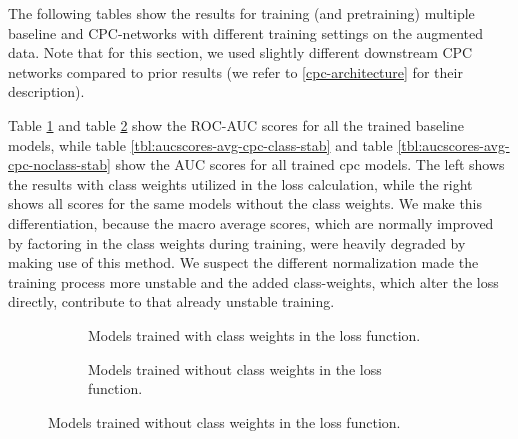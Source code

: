 The following tables show the results for training (and pretraining) multiple baseline and CPC-networks with different training settings on the augmented data. Note that for this section, we used slightly different downstream CPC networks compared to prior results (we refer to \autoref{cpc-architecture} for their description).

Table \ref{tbl:aucscores-avg-bl-class-stab} and table \ref{tbl:aucscores-avg-bl-noclass-stab} show the ROC-AUC scores for all the trained baseline models, while table \ref{tbl:aucscores-avg-cpc-class-stab} and table \ref{tbl:aucscores-avg-cpc-noclass-stab} show the AUC scores for all trained cpc models. The left shows the results with class weights utilized in the loss calculation, while the right shows all scores for the same models without the class weights. We make this differentiation, because the macro average scores, which are normally improved by factoring in the class weights during training, were heavily degraded by making use of this method. We suspect the different normalization made the training process more unstable and the added class-weights, which alter the loss directly, contribute to that already unstable training.
\begin{figure}[H]
	\begin{subfigure}[t]{0.49\hsize}\centering	
		
		\caption{Models trained with class weights in the loss function.}
		\label{tbl:aucscores-avg-bl-class-stab}	
	\end{subfigure}%
	\vline
	\begin{subfigure}[t]{0.49\hsize}\centering
		
		\caption{Models trained without class weights in the loss function.}
		\label{tbl:aucscores-avg-bl-noclass-stab}	
	\end{subfigure}
	\label{tbl:aucscores-avg-bl-stab}
\end{figure}
